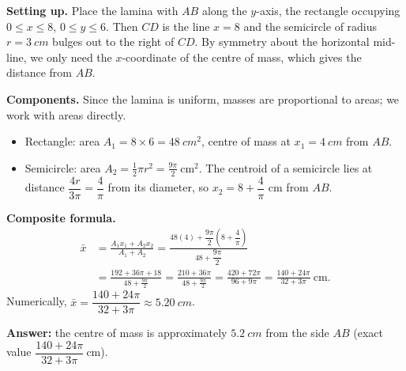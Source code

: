 \documentclass[11pt]{article}
\begin{document}
\begin{corrige}
\textbf{Setting up.} Place the lamina with $AB$ along the $y$-axis, the rectangle occupying $0 \le x \le 8$, $0 \le y \le 6$. Then $CD$ is the line $x = 8$ and the semicircle of radius $r = \SI{3}{cm}$ bulges out to the right of $CD$. By symmetry about the horizontal mid-line, we only need the $x$-coordinate of the centre of mass, which gives the distance from $AB$.

\textbf{Components.} Since the lamina is uniform, masses are proportional to areas; we work with areas directly.
\begin{itemize}
\item Rectangle: area $A_1 = 8 \times 6 = \SI{48}{cm^2}$, centre of mass at $x_1 = \SI{4}{cm}$ from $AB$.
\item Semicircle: area $A_2 = \tfrac12 \pi r^2 = \tfrac{9\pi}{2}\ \mathrm{cm^2}$. The centroid of a semicircle lies at distance $\dfrac{4r}{3\pi} = \dfrac{4}{\pi}$ from its diameter, so $x_2 = 8 + \dfrac{4}{\pi}$ cm from $AB$.
\end{itemize}

\textbf{Composite formula.}
\begin{align*}
\bar{x} &= \frac{A_1 x_1 + A_2 x_2}{A_1 + A_2}
= \frac{48(4) + \dfrac{9\pi}{2}\left(8 + \dfrac{4}{\pi}\right)}{48 + \dfrac{9\pi}{2}}\\[3pt]
&= \frac{192 + 36\pi + 18}{48 + \frac{9\pi}{2}}
= \frac{210 + 36\pi}{48 + \frac{9\pi}{2}}
= \frac{420 + 72\pi}{96 + 9\pi}
= \frac{140 + 24\pi}{32 + 3\pi}\ \mathrm{cm}.
\end{align*}
Numerically, $\bar{x} = \dfrac{140 + 24\pi}{32 + 3\pi} \approx \SI{5.20}{cm}$.

\textbf{Answer:} the centre of mass is approximately $\SI{5.2}{cm}$ from the side $AB$ (exact value $\dfrac{140+24\pi}{32+3\pi}\ \mathrm{cm}$).
\end{corrige}
\end{document}
